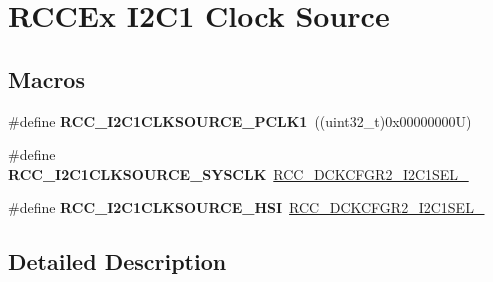 \hypertarget{group___r_c_c_ex___i2_c1___clock___source}{}\section{R\+C\+C\+Ex I2\+C1 Clock Source}
\label{group___r_c_c_ex___i2_c1___clock___source}
\subsection*{Macros}
\begin{DoxyCompactItemize}
\item 
\mbox{\label{group___r_c_c_ex___i2_c1___clock___source_ga2fc90800e3059c5e65977746386f651c}} 
\#define {\bfseries R\+C\+C\+\_\+\+I2\+C1\+C\+L\+K\+S\+O\+U\+R\+C\+E\+\_\+\+P\+C\+L\+K1}~((uint32\+\_\+t)0x00000000\+U)
\item 
\mbox{\label{group___r_c_c_ex___i2_c1___clock___source_ga1a04c52a4f4665188e40cd7f4018ea3f}} 
\#define {\bfseries R\+C\+C\+\_\+\+I2\+C1\+C\+L\+K\+S\+O\+U\+R\+C\+E\+\_\+\+S\+Y\+S\+C\+LK}~\mbox{\hyperlink{group___peripheral___registers___bits___definition_ga1df979e472c27a849daca7e0035d416d}{R\+C\+C\+\_\+\+D\+C\+K\+C\+F\+G\+R2\+\_\+\+I2\+C1\+S\+E\+L\+\_}}
\item 
\mbox{\label{group___r_c_c_ex___i2_c1___clock___source_ga5645524b292048cfe127da02ba9b3df7}} 
\#define {\bfseries R\+C\+C\+\_\+\+I2\+C1\+C\+L\+K\+S\+O\+U\+R\+C\+E\+\_\+\+H\+SI}~\mbox{\hyperlink{group___peripheral___registers___bits___definition_ga5c667a74f28fff26ae4fe41020825d70}{R\+C\+C\+\_\+\+D\+C\+K\+C\+F\+G\+R2\+\_\+\+I2\+C1\+S\+E\+L\+\_}}
\end{DoxyCompactItemize}


\subsection{Detailed Description}
